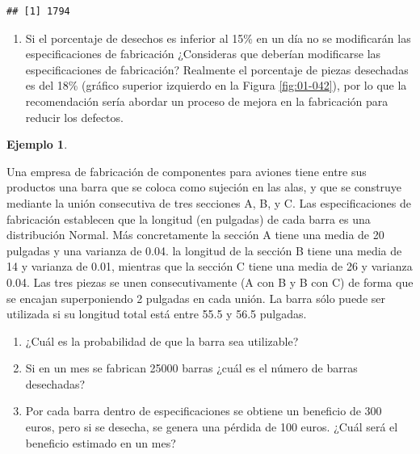 \documentclass[
]{book}
\newenvironment{Shaded}{\begin{snugshade}}{\end{snugshade}}
\newcommand{\DecValTok}[1]{\textcolor[rgb]{0.00,0.00,0.81}{#1}}
\newcommand{\FunctionTok}[1]{\textcolor[rgb]{0.00,0.00,0.00}{#1}}
\newcommand{\NormalTok}[1]{#1}
\newcommand{\SpecialCharTok}[1]{\textcolor[rgb]{0.00,0.00,0.00}{#1}}
\providecommand{\tightlist}{%
  \setlength{\itemsep}{0pt}\setlength{\parskip}{0pt}}
\theoremstyle{definition}
\theoremstyle{definition}
\newtheorem{example}{Ejemplo}[chapter]
\theoremstyle{definition}
\theoremstyle{definition}
\theoremstyle{remark}
\begin{document}
\begin{Shaded}
\end{Shaded}

\begin{verbatim}
## [1] 1794
\end{verbatim}

\begin{enumerate}
\def\labelenumi{\arabic{enumi}.}
\setcounter{enumi}{2}
\tightlist
\item
  Si el porcentaje de desechos es inferior al 15\% en un día no se modificarán las especificaciones de fabricación ¿Consideras que deberían modificarse las especificaciones de fabricación? Realmente el porcentaje de piezas desechadas es del 18\% (gráfico superior izquierdo en la Figura \ref{fig:01-042}), por lo que la recomendación sería abordar un proceso de mejora en la fabricación para reducir los defectos.
\end{enumerate}

\begin{example}
\protect\hypertarget{exm:combined3}{}\label{exm:combined3}

Una empresa de fabricación de componentes para aviones tiene entre sus productos una barra que se coloca como sujeción en las alas, y que se construye mediante la unión consecutiva de tres secciones A, B, y C. Las especificaciones de fabricación establecen que la longitud (en pulgadas) de cada barra es una distribución Normal. Más concretamente la sección A tiene una media de 20 pulgadas y una varianza de 0.04. la longitud de la sección B tiene una media de 14 y varianza de 0.01, mientras que la sección C tiene una media de 26 y varianza 0.04. Las tres piezas se unen consecutivamente (A con B y B con C) de forma que se encajan superponiendo 2 pulgadas en cada unión. La barra sólo puede ser utilizada si su longitud total está entre 55.5 y 56.5 pulgadas.

\begin{enumerate}
\def\labelenumi{\arabic{enumi}.}
\tightlist
\item
  ¿Cuál es la probabilidad de que la barra sea utilizable?
\item
  Si en un mes se fabrican 25000 barras ¿cuál es el número de barras desechadas?
\item
  Por cada barra dentro de especificaciones se obtiene un beneficio de 300 euros, pero si se desecha, se genera una pérdida de 100 euros. ¿Cuál será el beneficio estimado en un mes?
\end{enumerate}

\end{example}
\end{document}
